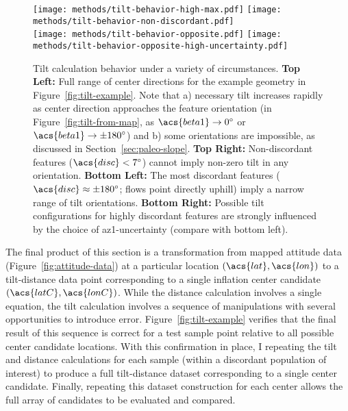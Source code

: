 \begin{figure}
    \vspace{-19pt}
    \texttt{[image: methods/tilt-behavior-high-max.pdf]}%
    \texttt{[image: methods/tilt-behavior-non-discordant.pdf]}\\
    \texttt{[image: methods/tilt-behavior-opposite.pdf]}%
    \texttt{[image: methods/tilt-behavior-opposite-high-uncertainty.pdf]}%
    \caption[Tilt calculation behavior]{Tilt calculation behavior under a variety of circumstances. \textbf{Top Left:} Full range of center directions for the example geometry in Figure~\ref{fig:tilt-example}. Note that a) necessary tilt increases rapidly as center direction approaches the feature orientation (in Figure~\ref{fig:tilt-from-map}, as $\acs{beta1}\to\ang{0}$ or $\acs{beta1}\to\pm\ang{180}$) and b) some orientations are impossible, as discussed in Section~\ref{sec:paleo-slope}. \textbf{Top Right:} Non-discordant features ($\acs{disc} < \ang{7}$) cannot imply non-zero tilt in any orientation. \textbf{Bottom Left:} The most discordant features ($\acs{disc}\approx\pm\ang{180}$; flows point directly uphill) imply a narrow range of tilt orientations. \textbf{Bottom Right:} Possible tilt configurations for highly discordant features are strongly influenced by the choice of \acs{az1}-uncertainty (compare with bottom left).}
    \label{fig:tilt-behavior}
\end{figure}

The final product of this section is a transformation from mapped attitude data (Figure~\ref{fig:attitude-data}) at a particular location $(\acs{lat}, \acs{lon})$ to a tilt-distance data point corresponding to a single inflation center candidate $(\acs{latC}, \acs{lonC})$. While the distance calculation involves a single equation, the tilt calculation involves a sequence of manipulations with several opportunities to introduce error. Figure~\ref{fig:tilt-example} verifies that the final result of this sequence is correct for a test sample point relative to all possible center candidate locations. With this confirmation in place, I repeating the tilt and distance calculations for each sample (within a discordant population of interest) to produce a full tilt-distance dataset corresponding to a single center candidate. Finally, repeating this dataset construction for each center allows the full array of candidates to be evaluated and compared.